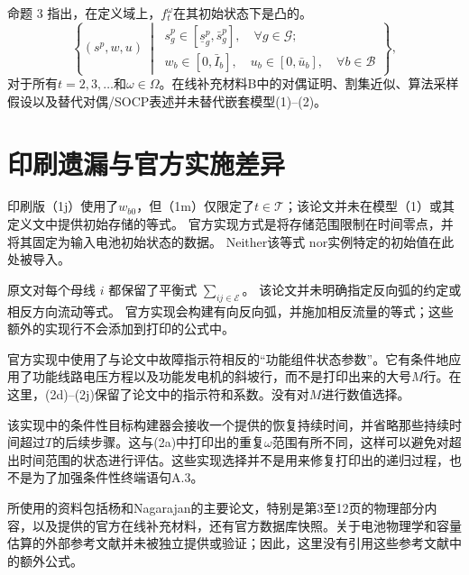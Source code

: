 \documentclass[10pt]{article}
\begin{document}
命题 3 指出，在定义域上，$f_t^\omega$在其初始状态下是凸的。
\[
\left\{(s^p,w,u)\ \middle|\
\begin{array}{l}
s_g^p\in[\underline s_g^p,\bar s_g^p],\quad\forall g\in\mathcal G;\\
w_b\in[0,\bar I_b],\quad u_b\in[0,\bar u_b],\quad\forall b\in\mathcal B
\end{array}\right\},
\]
对于所有$t=2,3,\ldots$和$\omega\in\Omega$。在线补充材料B中的对偶证明、割集近似、算法采样假设以及替代对偶/SOCP表述并未替代嵌套模型(1)--(2)。

\section*{印刷遗漏与官方实施差异}
印刷版（1j）使用了$w_{b0}$，但（1m）仅限定了$t\in\mathcal T$；该论文并未在模型（1）或其定义文中提供初始存储的等式。 官方实现方式是将存储范围限制在时间零点，并将其固定为输入电池初始状态的数据。 Neither该等式 nor实例特定的初始值在此处被导入。

原文对每个母线 $i$ 都保留了平衡式 $\sum_{ij\in\mathcal E}$。 该论文并未明确指定反向弧的约定或相反方向流动等式。 官方实现会构建有向反向弧，并施加相反流量的等式；这些额外的实现行不会添加到打印的公式中。

官方实现中使用了与论文中故障指示符相反的“功能组件状态参数”。它有条件地应用了功能线路电压方程以及功能发电机的斜坡行，而不是打印出来的大号$M$行。在这里，(2d)--(2j)保留了论文中的指示符和系数。没有对$M$进行数值选择。

该实现中的条件性目标构建器会接收一个提供的恢复持续时间，并省略那些持续时间超过$T$的后续步骤。这与(2a)中打印出的重复$\omega$范围有所不同，这样可以避免对超出时间范围的状态进行评估。这些实现选择并不是用来修复打印出的递归过程，也不是为了加强条件性终端语句A.3。

所使用的资料包括杨和Nagarajan的主要论文，特别是第3至12页的物理部分内容，以及提供的官方在线补充材料，还有官方数据库快照。关于电池物理学和容量估算的外部参考文献并未被独立提供或验证；因此，这里没有引用这些参考文献中的额外公式。
\end{document}
